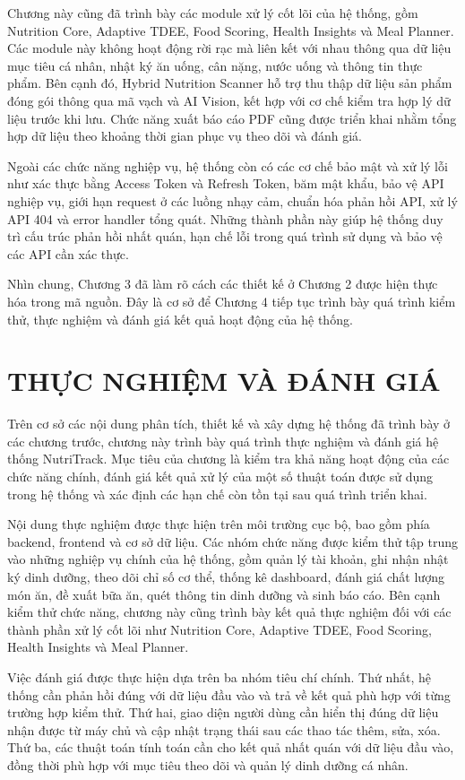 \documentclass[12pt, a4paper]{report}
\begin{document}
Chương này cũng đã trình bày các module xử lý cốt lõi của hệ thống, gồm Nutrition Core, Adaptive TDEE, Food Scoring, Health Insights và Meal Planner. Các module này không hoạt động rời rạc mà liên kết với nhau thông qua dữ liệu mục tiêu cá nhân, nhật ký ăn uống, cân nặng, nước uống và thông tin thực phẩm. Bên cạnh đó, Hybrid Nutrition Scanner hỗ trợ thu thập dữ liệu sản phẩm đóng gói thông qua mã vạch và AI Vision, kết hợp với cơ chế kiểm tra hợp lý dữ liệu trước khi lưu. Chức năng xuất báo cáo PDF cũng được triển khai nhằm tổng hợp dữ liệu theo khoảng thời gian phục vụ theo dõi và đánh giá.

Ngoài các chức năng nghiệp vụ, hệ thống còn có các cơ chế bảo mật và xử lý lỗi như xác thực bằng Access Token và Refresh Token, băm mật khẩu, bảo vệ API nghiệp vụ, giới hạn request ở các luồng nhạy cảm, chuẩn hóa phản hồi API, xử lý API 404 và error handler tổng quát. Những thành phần này giúp hệ thống duy trì cấu trúc phản hồi nhất quán, hạn chế lỗi trong quá trình sử dụng và bảo vệ các API cần xác thực.

Nhìn chung, Chương 3 đã làm rõ cách các thiết kế ở Chương 2 được hiện thực hóa trong mã nguồn. Đây là cơ sở để Chương 4 tiếp tục trình bày quá trình kiểm thử, thực nghiệm và đánh giá kết quả hoạt động của hệ thống.

\chapter{THỰC NGHIỆM VÀ ĐÁNH GIÁ}
Trên cơ sở các nội dung phân tích, thiết kế và xây dựng hệ thống đã trình bày ở các chương trước, chương này trình bày quá trình thực nghiệm và đánh giá hệ thống NutriTrack. Mục tiêu của chương là kiểm tra khả năng hoạt động của các chức năng chính, đánh giá kết quả xử lý của một số thuật toán được sử dụng trong hệ thống và xác định các hạn chế còn tồn tại sau quá trình triển khai.

Nội dung thực nghiệm được thực hiện trên môi trường cục bộ, bao gồm phía backend, frontend và cơ sở dữ liệu. Các nhóm chức năng được kiểm thử tập trung vào những nghiệp vụ chính của hệ thống, gồm quản lý tài khoản, ghi nhận nhật ký dinh dưỡng, theo dõi chỉ số cơ thể, thống kê dashboard, đánh giá chất lượng món ăn, đề xuất bữa ăn, quét thông tin dinh dưỡng và sinh báo cáo. Bên cạnh kiểm thử chức năng, chương này cũng trình bày kết quả thực nghiệm đối với các thành phần xử lý cốt lõi như Nutrition Core, Adaptive TDEE, Food Scoring, Health Insights và Meal Planner.

Việc đánh giá được thực hiện dựa trên ba nhóm tiêu chí chính. Thứ nhất, hệ thống cần phản hồi đúng với dữ liệu đầu vào và trả về kết quả phù hợp với từng trường hợp kiểm thử. Thứ hai, giao diện người dùng cần hiển thị đúng dữ liệu nhận được từ máy chủ và cập nhật trạng thái sau các thao tác thêm, sửa, xóa. Thứ ba, các thuật toán tính toán cần cho kết quả nhất quán với dữ liệu đầu vào, đồng thời phù hợp với mục tiêu theo dõi và quản lý dinh dưỡng cá nhân.
\end{document}
